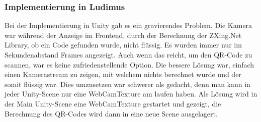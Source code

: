 \subsubsection{Implementierung in Ludimus}
Bei der Implementierung in Unity gab es ein gravierendes Problem. Die Kamera war während der Anzeige im Frontend, durch der Berechnung der ZXing.Net Library, ob ein Code gefunden wurde, nicht flüssig. Es wurden immer nur im Sekundenabstand Frames angezeigt. Auch wenn das reicht, um den QR-Code zu scannen, war es keine zufriedenstellende Option. Die bessere Lösung war, einfach einen Kamerastream zu zeigen, mit welchem nichts berechnet wurde und der somit flüssig war. Dies umzusetzen war schwerer als gedacht, denn man kann in jeder Unity-Scene nur eine WebCamTexture am laufen haben. Als Lösung wird in der Main Unity-Scene eine WebCamTexture gestartet und gezeigt, die Berechnung des QR-Codes wird dann in eine neue Scene ausgelagert. 
